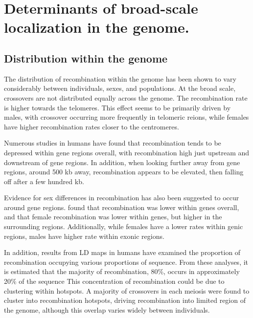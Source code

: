 \section{Determinants of broad-scale localization in the genome.}

\subsection{Distribution within the genome}

The distribution of recombination within the genome has been shown to vary considerably between individuals, sexes, and populations.
At the broad scale, crossovers are not distributed equally across the genome.
The recombination rate is higher towards the telomeres\cite{Broman1998,Mcvean2004,hapmap2007}.
This effect seems to be primarily driven by males, with crossover occurring more frequently in telomeric reions, while females have higher recombination rates closer to the centromeres\cite{Kong2002,Coop2008,Kong2010}.

Numerous studies in humans have found that recombination tends to be depressed within gene regions overall, with recombination high just upstream and downstream of gene regions\cite{Mcvean2004,Myers2005,hapmap2007,Spencer2006,Kong2010}.
In addition, when looking further away from gene regions, around 500 kb away, recombination appears to be elevated, then falling off after a few hundred kb.

Evidence for sex differences in recombination has also been suggested to occur around gene regions.
\citet{Kong2010} found that recombination was lower within genes overall, and that
female recombination was lower within genes, but higher in the surrounding regions.
Additionally, while females have a lower rates within genic regions, males have higher rate within exonic regions.

In addition, results from LD maps in humans have examined the proportion of recombination occupying various proportions of sequence.
From these analyses, it is estimated that the majority of recombination, 80\%, occurs in approximately 20\% of the sequence\cite{Mcvean2004,Myers2005,hapmap2007}
This concentration of recombination could be due to clustering within hotspots.
A majority of crossovers in each meiosis were found to cluster into recombination hotspots, driving recombination into limited region of the genome\cite{Coop2008}, although this overlap varies widely between individuals.


